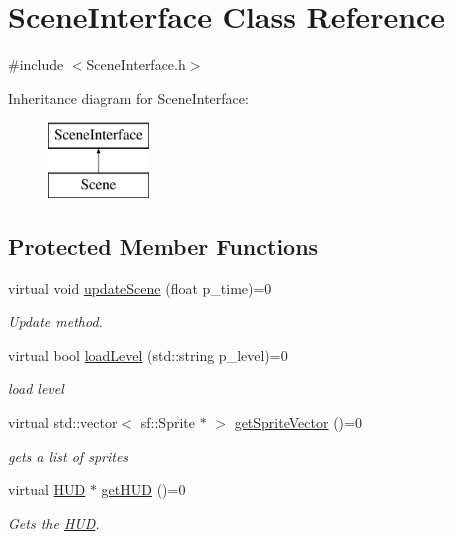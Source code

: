 \hypertarget{class_scene_interface}{}\section{Scene\+Interface Class Reference}
\label{class_scene_interface}


{\ttfamily \#include $<$Scene\+Interface.\+h$>$}

Inheritance diagram for Scene\+Interface\+:\begin{figure}[H]
\begin{center}
\leavevmode
\includegraphics[height=2.000000cm]{class_scene_interface}
\end{center}
\end{figure}
\subsection*{Protected Member Functions}
\begin{DoxyCompactItemize}
\item 
\mbox{\label{class_scene_interface_a3944b25997f846ce54128e10fccd69c5}} 
virtual void \mbox{\hyperlink{class_scene_interface_a3944b25997f846ce54128e10fccd69c5}{update\+Scene}} (float p\+\_\+time)=0
\begin{DoxyCompactList}\small\item\em Update method. \end{DoxyCompactList}\item 
virtual bool \mbox{\hyperlink{class_scene_interface_a54c0b8784bcb2278aeb9b6030df9a158}{load\+Level}} (std\+::string p\+\_\+level)=0
\begin{DoxyCompactList}\small\item\em load level \end{DoxyCompactList}\item 
virtual std\+::vector$<$ sf\+::\+Sprite $\ast$ $>$ \mbox{\hyperlink{class_scene_interface_af4cdfa0df6cbbba34d66870ea83b2a0a}{get\+Sprite\+Vector}} ()=0
\begin{DoxyCompactList}\small\item\em gets a list of sprites \end{DoxyCompactList}\item 
\mbox{\label{class_scene_interface_a7c5194abd1f623d4e4da61779a164a12}} 
virtual \mbox{\hyperlink{class_h_u_d}{H\+UD}} $\ast$ \mbox{\hyperlink{class_scene_interface_a7c5194abd1f623d4e4da61779a164a12}{get\+H\+UD}} ()=0
\begin{DoxyCompactList}\small\item\em Gets the \mbox{\hyperlink{class_h_u_d}{H\+UD}}. \end{DoxyCompactList}\end{DoxyCompactItemize}


